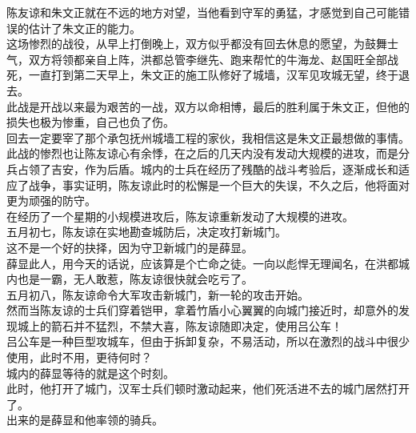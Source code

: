 \begin{multicols}{\theparacolNo}
陈友谅和朱文正就在不远的地方对望，当他看到守军的勇猛，才感觉到自己可能错误的估计了朱文正的能力。\\

这场惨烈的战役，从早上打倒晚上，双方似乎都没有回去休息的愿望，为鼓舞士气，双方将领都亲自上阵，洪都总管李继先、跑来帮忙的牛海龙、赵国旺全部战死，一直打到第二天早上，朱文正的施工队修好了城墙，汉军见攻城无望，终于退去。\\

此战是开战以来最为艰苦的一战，双方以命相博，最后的胜利属于朱文正，但他的损失也极为惨重，自己也负了伤。\\

回去一定要宰了那个承包抚州城墙工程的家伙，我相信这是朱文正最想做的事情。\\

此战的惨烈也让陈友谅心有余悸，在之后的几天内没有发动大规模的进攻，而是分兵占领了吉安，作为后盾。城内的士兵在经历了残酷的战斗考验后，逐渐成长和适应了战争，事实证明，陈友谅此时的松懈是一个巨大的失误，不久之后，他将面对更为顽强的防守。\\

在经历了一个星期的小规模进攻后，陈友谅重新发动了大规模的进攻。\\

五月初七，陈友谅在实地勘查城防后，决定攻打新城门。\\

这不是一个好的抉择，因为守卫新城门的是薛显。\\

薛显此人，用今天的话说，应该算是个亡命之徒。一向以彪悍无理闻名，在洪都城内也是一霸，无人敢惹，陈友谅很快就会吃亏了。\\

五月初八，陈友谅命令大军攻击新城门，新一轮的攻击开始。\\

然而当陈友谅的士兵们穿着铠甲，拿着竹盾小心翼翼的向城门接近时，却意外的发现城上的箭石并不猛烈，不禁大喜，陈友谅随即决定，使用吕公车！\\

吕公车是一种巨型攻城车，但由于拆卸复杂，不易活动，所以在激烈的战斗中很少使用，此时不用，更待何时？\\

城内的薛显等待的就是这个时刻。\\

此时，他打开了城门，汉军士兵们顿时激动起来，他们死活进不去的城门居然打开了。\\

出来的是薛显和他率领的骑兵。\\


\end{multicols}
